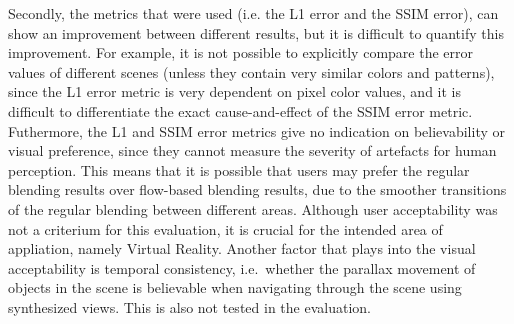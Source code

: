 Secondly, the metrics that were used (i.e. the L1 error and the SSIM error), can show an improvement between different results, but it is difficult to quantify this improvement. For example, it is not possible to explicitly compare the error values of different scenes (unless they contain very similar colors and patterns), since the L1 error metric is very dependent on pixel color values, and it is difficult to differentiate the exact cause-and-effect of the SSIM error metric. Futhermore, the L1 and SSIM error metrics give no indication on believability or visual preference, since they cannot measure the severity of artefacts for human perception. This means that it is possible that users may prefer the regular blending results over flow-based blending results, due to the smoother transitions of the regular blending between different areas. Although user acceptability was not a criterium for this evaluation, it is crucial for the intended area of appliation, namely Virtual Reality. Another factor that plays into the visual acceptability is temporal consistency, i.e.\ whether the parallax movement of objects in the scene is believable when navigating through the scene using synthesized views. This is also not tested in the evaluation.

